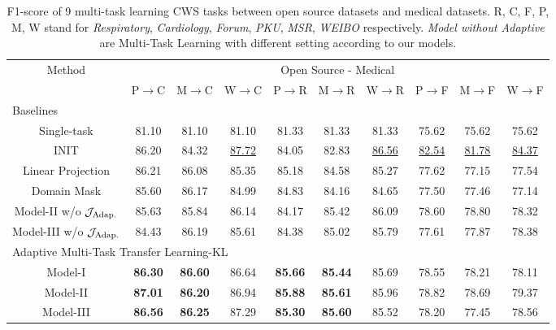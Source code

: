 \begin{table*}[t!]
\small
\centering
\caption{F1-score of 9 multi-task learning CWS tasks between open source datasets and medical datasets. R, C, F, P, M, W stand for \textit{Respiratory}, \textit{Cardiology}, \textit{Forum}, \textit{PKU}, \textit{MSR}, \textit{WEIBO} respectively. \textit{Model without Adaptive} are Multi-Task Learning with different setting according to our models.}\label{table:experiment2}
\begin{tabular}{|c|c|c|c|c|c|c|c|c|c|}
\hline
\multirow{2}{*}{Method} & \multicolumn{9}{c|}{Open Source - Medical} \\ \cline{2-10} & P$\rightarrow$C & M$\rightarrow$C & W$\rightarrow$C & P$\rightarrow$R & M$\rightarrow$R & W$\rightarrow$R & P$\rightarrow$F & M$\rightarrow$F & W$\rightarrow$F \\
\hline
\hline
\multicolumn{10}{|l|}{Baselines} \\
\hline
Single-task & 81.10 & 81.10 & 81.10 & 81.33 & 81.33 & 81.33 & 75.62 & 75.62 & 75.62 \\
\hline
INIT & 86.20 & 84.32 & \underline{87.72} & 84.05 & 82.83 & \underline{86.56} & \underline{82.54} & \underline{81.78} & \underline{84.37}\\
\hline
Linear Projection & 86.21 & 86.08 & 85.35 & 85.18 & 84.58 & 85.27 & 77.62 & 77.15 & 77.54 \\
\hline
Domain Mask & 85.60 & 86.17 & 84.99 & 84.83 & 84.16 & 84.65 & 77.50 & 77.46 & 77.14 \\
\hline
Model-\RN{2} w/o $\mathcal{J}_\textnormal{Adap.}$ & 85.63 & 85.84 & 86.14 & 84.17 & 85.42 & 86.09 & 78.60 & 78.80 & 78.32\\
\hline
Model-\RN{3} w/o $\mathcal{J}_\textnormal{Adap.}$ & 84.43 & 86.19 & 85.61 & 84.38 & 85.02 & 85.79 & 77.61 & 77.87 & 78.38\\
\hline
\hline
\multicolumn{10}{|l|}{Adaptive Multi-Task Transfer Learning-KL} \\
\hline
Model-\RN{1} & \textbf{86.30} & \textbf{86.60} & 86.64 & \textbf{85.66} & \textbf{85.44} & 85.69 & 78.55 & 78.21 & 78.11\\
\hline
Model-\RN{2} & \textbf{87.01} & \textbf{86.20} & 86.94 & \textbf{85.88} & \textbf{85.61} & 85.96 & 78.82 & 78.69 & 79.37 \\
\hline
Model-\RN{3} & \textbf{86.56} & \textbf{86.25} & 87.29 & \textbf{85.30}  & \textbf{85.60} & 85.52 & 78.20 & 77.45 & 78.56 \\

\end{tabular}
\end{table*}
